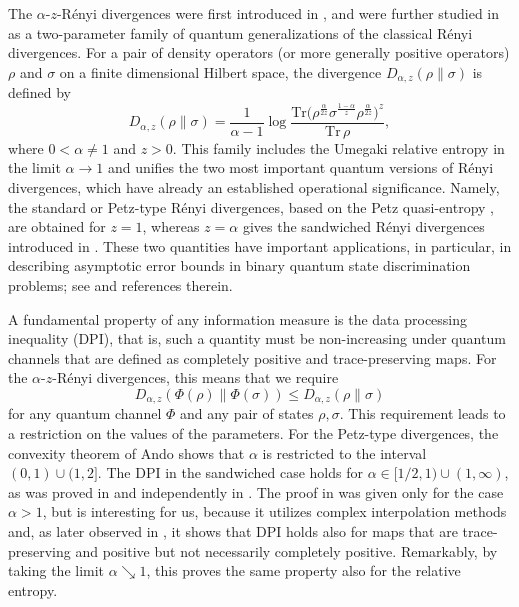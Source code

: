 \documentclass[12pt]{article}
\theoremstyle{definition}
\theoremstyle{remark}
\numberwithin{equation}{section}
\begin{document}
The $\alpha$-$z$-R\'enyi divergences were {first introduced in \cite{jaksic2012entropic}, and
were further studied} in \cite{audenaert2015alpha} as a two-parameter family of quantum generalizations
of the classical R\'enyi divergences. For a pair of density operators (or more generally positive
operators) $\rho$ and $\sigma$ on a finite dimensional Hilbert space, the divergence
$D_{\alpha,z}(\rho\|\sigma)$ is defined by 
\[
D_{\alpha,z}(\rho\|\sigma)=\frac{1}{\alpha-1}\log
{\frac{\mathrm{Tr}\bigl(\rho^{\frac{\alpha}{2z}}\sigma^{\frac{1-\alpha}{z}}
\rho^{\frac{\alpha}{2z}}\bigr)^z}{\mathrm{Tr}\,\rho},}
\]
where $0<\alpha\ne 1$ and $z>0$. This family includes the {Umegaki} relative entropy in the
limit $\alpha\to 1$ and unifies the two most important quantum
versions of R\'enyi divergences, which have already an established operational
significance. Namely, the standard or Petz-type R\'enyi divergences,  based on the Petz
quasi-entropy \cite{petz1985quasi,petz1986quasi}, are obtained for $z=1$,  whereas $z=\alpha$ gives
the sandwiched R\'enyi divergences introduced in \cite{mullerlennert2013onquantum, wilde2014strong}.
These two quantities have important applications, {in particular, in describing asymptotic error bounds in
binary quantum state discrimination problems; see \cite{audenaert2007discriminating,jaksic2012quantum,
mosonyi2015quantum,mosonyi2015twoapproaches,nussbaum2009thechernoff} and references therein.}


A fundamental property of any information measure is the data processing inequality (DPI), that
is, such a quantity must be non-increasing under quantum channels that are defined as completely
positive and trace-preserving maps. For the {$\alpha$-$z$-R\'enyi} divergences, this means
that we require
\[
D_{\alpha,z}(\Phi(\rho)\|\Phi(\sigma))\le D_{\alpha,z}(\rho\|\sigma)
\]
for any quantum channel $\Phi$ and any pair of states $\rho,\sigma$. This requirement
leads to a restriction on the values of the parameters. For the Petz-type divergences,
 the convexity theorem of Ando \cite{ando1979concavity} shows that  $\alpha$ is restricted to the interval
$(0,1)\cup (1,2]$. The DPI in the sandwiched case holds for $\alpha\in
[1/2,1)\cup(1,\infty)$, as was proved in  \cite{frank2013monotonicity}  and independently in
\cite{beigi2013sandwiched}. The proof in \cite{beigi2013sandwiched} was given only for
the case $\alpha>1$, but is interesting for us, because it utilizes complex interpolation
methods and, as later observed in \cite{mullerhermes2017monotonicity}, it shows that DPI holds also for
maps that are trace-preserving and positive but not necessarily completely positive. Remarkably, by taking
the limit $\alpha\searrow 1$, this proves {the same} property also for the relative entropy.
\end{document}
